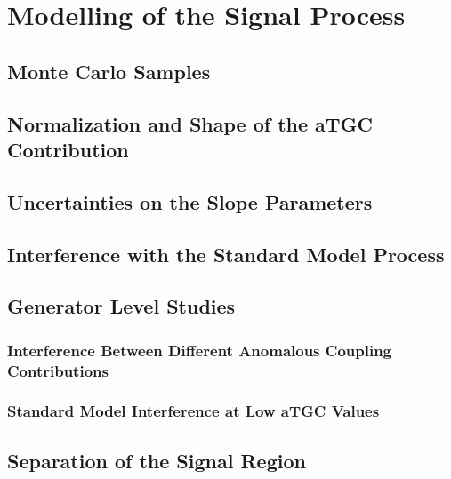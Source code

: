 \chapter{Modelling of the Signal Process}
\label{chap::ModellingoftheSignalProcess}

\section{Monte Carlo Samples}
\section{Normalization and Shape of the aTGC Contribution}
\section{Uncertainties on the Slope Parameters}
\section{Interference with the Standard Model Process}
\section{Generator Level Studies}
\subsection{Interference Between Different Anomalous Coupling Contributions}
\subsection{Standard Model Interference at Low aTGC Values}
\section{Separation of the Signal Region}